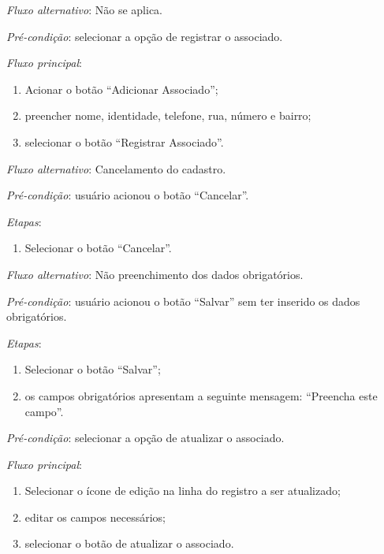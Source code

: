 \noindent \textit{Fluxo alternativo}: Não se aplica.




\vspace{0.7cm}

\noindent \textit{Pré-condição}: selecionar a opção de registrar o associado.

\noindent \textit{Fluxo principal}:

\begin{enumerate}
    \item Acionar o botão ``Adicionar Associado'';
    \item preencher nome, identidade, telefone, rua, número e bairro;
    \item selecionar o botão ``Registrar Associado''.
\end{enumerate}

\noindent \textit{Fluxo alternativo}: Cancelamento do cadastro.

\noindent \textit{Pré-condição}: usuário acionou o botão ``Cancelar''.

\noindent \textit{Etapas}:

\begin{enumerate}
    \item Selecionar o botão ``Cancelar''.
\end{enumerate}

\noindent \textit{Fluxo alternativo}: Não preenchimento dos dados obrigatórios.

\noindent \textit{Pré-condição}: usuário acionou o botão ``Salvar'' sem ter inserido os dados obrigatórios.

\noindent \textit{Etapas}:

\begin{enumerate}
    \item Selecionar o botão ``Salvar'';
    \item os campos obrigatórios apresentam a seguinte mensagem: ``Preencha este campo''.
\end{enumerate}




\vspace{0.7cm}

\noindent \textit{Pré-condição}: selecionar a opção de atualizar o associado.

\noindent \textit{Fluxo principal}:

\begin{enumerate}
    \item Selecionar o ícone de edição na linha do registro a ser atualizado;
    \item editar os campos necessários;
    \item selecionar o botão de atualizar o associado.
\end{enumerate}

